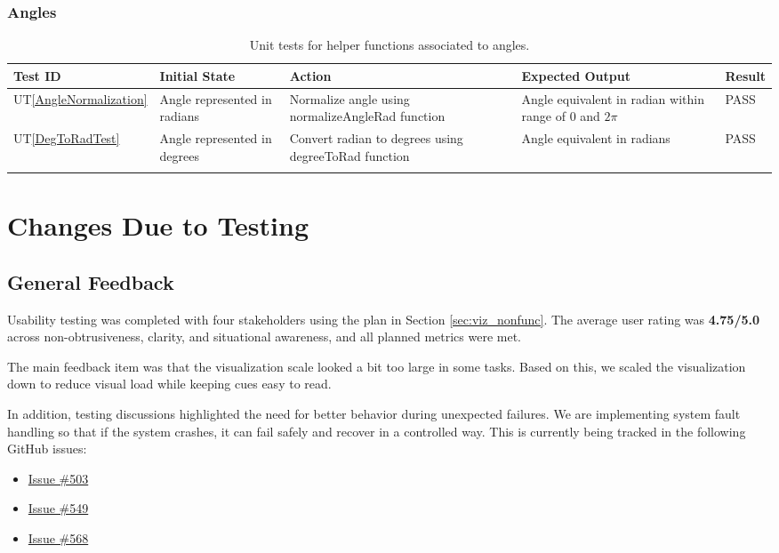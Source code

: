 \documentclass[12pt, titlepage]{article}
\newcommand{\utref}[1]{UT\ref{#1}}
\begin{document}
\subsubsection{Angles}
{\footnotesize
\begin{longtable}{|p{0.8cm}|p{3.5cm}|p{3.5cm}|p{3.5cm}|p{1cm}|}
    \hline
    \textbf{Test ID} & \textbf{Initial State} & \textbf{Action} &
    \textbf{Expected Output} & \textbf{Result} \\ 
    \endfirsthead
    \hline
    
    \utref{AngleNormalization} & Angle represented in radians & Normalize angle
    using normalizeAngleRad function & Angle equivalent in radian within range
    of 0 and $2\pi$ & PASS\\ \hline
    \utref{DegToRadTest} & Angle represented in degrees & Convert radian to
    degrees using degreeToRad function & Angle equivalent in radians & PASS\\
    \hline

    \caption{Unit tests for helper functions associated to angles.}
    \label{tab:unit_test_angles}
\end{longtable}
}

\section{Changes Due to Testing}

\subsection{General Feedback}

Usability testing was completed with four stakeholders using the plan in Section
\ref{sec:viz_nonfunc}. The average user rating was \textbf{4.75/5.0} across
non-obtrusiveness, clarity, and situational awareness, and all planned metrics
were met.

The main feedback item was that the visualization scale looked a bit too large
in some tasks. Based on this, we scaled the visualization down to reduce visual
load while keeping cues easy to read.

In addition, testing discussions highlighted the need for better behavior during
unexpected failures. We are implementing system fault handling so that if the
system crashes, it can fail safely and recover in a controlled way. This is
currently being tracked in the following GitHub issues:

\begin{itemize}
    \item \href{https://github.com/Team6-SixSense/audio360/issues/503}{Issue 
    \#503}
    \item \href{https://github.com/Team6-SixSense/audio360/issues/549}{Issue 
    \#549}
    \item \href{https://github.com/Team6-SixSense/audio360/issues/568}{Issue
    \#568}
\end{itemize}
\end{document}
